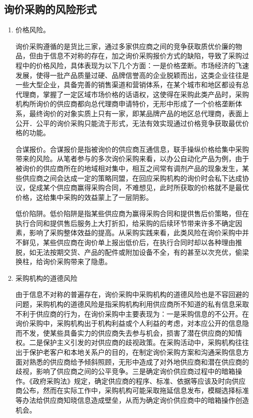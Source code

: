 \subsection {询价采购的风险形式}

    \begin{enumerate}
    \item  价格风险。

        询价采购遵循的是货比三家，通过多家供应商之间的竞争获取质优价廉的物品，但由于信息不对称的存在，加之询价采购报价方式的缺陷，导致了采购过程中的价格风险，具体表现为以下几个方面：一是价格垄断。市场经济的飞速发展，使得一批产品质量过硬、品牌信誉高的企业脱颖而出，这类企业往往是一些大型企业，具备完善的销售渠道和营销体系，在某个城市和地区都设有总代理商，掌握了一定区域市场价格的话语权，这使得在采购此类产品时，采购机构所询价的供应商都向总代理商申请特价，无形中形成了一个价格垄断体系，最终询价的对象实质上只有一家，即某品牌产品的地区总代理商，表面上公开．公平的询价采购只能流于形式，无法有效实现通过价格竞争获取最优价格的功能。

        合谋报价。合谋报价是指被询价的供应商互通信息，联手操纵价格给集中采购带来的风险。从笔者参与的多次询价采购来看，以办公自动化产品为例，由于被询价的供应商所在的地域相对集中，相互之间常有调剂产品的现象发生，某些供应商之间会达成一定的策略同盟，在回应采购机构的询价时会私下达成协议，促成某个供应商赢得采购合同，不难想见，此时所获取的价格就不是最优价格，这给集中采购的效益蒙上了一层阴影。

        低价陷阱。低价陷阱是指某些供应商为赢得采购合同和提供售后价策略，但在执行合同和提供售后服务上大打折扣，给采购的后续环节带来许多不确定因素，影响了采购整体效益的提高。从采购实践来看，此类风险在询价采购中并不鲜见，某些供应商在询价单上报出低价后，在执行合同时却以各种理由推脱，如无法按期交货、产品的配件或附加设备不全，有的甚至以次充优，偷梁换柱，给询价采购带来了隐患。

    \item  采购机构的道德风险

        由于信息不对称的普遍存在，询价采购中采购机构的道德风险也是不容回避的问题，采购机构的道德风险是指采购机构利用供应商所不知道的私有信息采取不利于供应商的行为，在询价采购中主要表现为：一是采购信息的不公开。在询价采购中，采购机构出于机构利益或个人利益的考虑，对本应公开的信息隐而不发，使某些具备实力的供应商失去参与机会，损害了潜在供应商的知情权。二是保护主义引发的对供应商的歧视政策。在采购活动中，采购机构往往出于保护老客户和本地关系户的目的，在制定询价采购方案和沟通采购信息方面对熟悉的供应商给予倾斜照顾，无形中造成了对外地供应商和潜在供应商的歧视，影响了供应商之间的公平竞争。三是确定询价供应商过程中的暗箱操作。《政府采购法》规定，确定供应商的程序、标准、依据等应该及时向供应商公布，然而在实际工作中，采购机构可能采取拖延信息发布，模糊选择标准等办法给供应商知晓信息造成壁垒，从而为确定询价供应商中的暗箱操作创造机会。


\end{enumerate}

